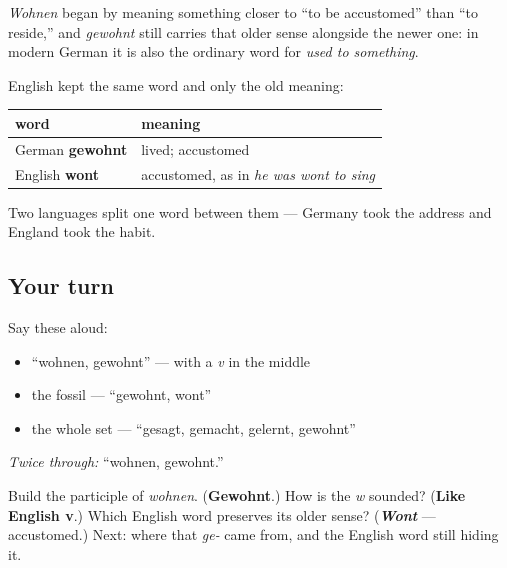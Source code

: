 \begin{cousinweb}
\emph{Wohnen} began by meaning something closer to \textquotedblleft{}to be accustomed\textquotedblright{} than \textquotedblleft{}to reside,\textquotedblright{} and \emph{gewohnt} still carries that older sense alongside the newer one: in modern German it is also the ordinary word for \emph{used to something}.

English kept the same word and only the old meaning:

\noindent
\begin{tabularx}{\linewidth}{@{}>{\raggedright\arraybackslash}X>{\raggedright\arraybackslash}X@{}}
\toprule
\textbf{word} & \textbf{meaning} \\
\midrule
German \textbf{gewohnt} & lived; accustomed \\
English \textbf{wont} & accustomed, as in \emph{he was wont to sing} \\
\bottomrule
\end{tabularx}

Two languages split one word between them — Germany took the address and England took the habit.
\end{cousinweb}

\subsection*{Your turn}
Say these aloud:

\begin{itemize}
\raggedright
  \item \textquotedblleft{}wohnen, gewohnt\textquotedblright{} — with a \emph{v} in the middle
  \item the fossil — \textquotedblleft{}gewohnt, wont\textquotedblright{}
  \item the whole set — \textquotedblleft{}gesagt, gemacht, gelernt, gewohnt\textquotedblright{}
\end{itemize}

\emph{Twice through:} \textquotedblleft{}wohnen, gewohnt.\textquotedblright{}

\begin{tcolorbox}[breakable,colback=teal!4,colframe=teal!35!black,title={Before you move on}]
Build the participle of \emph{wohnen}. (\textbf{Gewohnt}.) How is the \emph{w} sounded? (\textbf{Like English v}.) Which English word preserves its older sense? (\emph{\textbf{Wont}} — accustomed.) Next: where that \emph{ge-} came from, and the English word still hiding it.
\end{tcolorbox}

